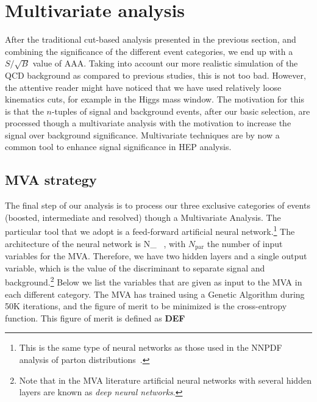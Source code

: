 
\section{Multivariate analysis}
\label{sec:mva}

After the traditional cut-based analysis presented in the previous section,
and combining the significance of the different event categories,
we end up with a $S/\sqrt{B}$ value of AAA.
%
Taking into account our more realistic simulation of the QCD background as
compared to previous studies, this is not too bad.
%
However, the attentive reader might have noticed that we have used
relatively 
loose kinematics cuts, for example in the Higgs mass window.
%
The motivation for this is that the $n$-tuples of signal and background
events, after our basic selection, are processed though a multivariate
analysis with the motivation to increase the signal over background
significance.
%
Multivariate techniques are by now a common tool to enhance signal
significance in HEP analysis.

\subsection{MVA strategy}

The final step of our analysis is to process our three exclusive
categories of events (boosted, intermediate and resolved) though
a Multivariate Analysis.
%
The particular tool that we adopt is
a feed-forward artificial neural network.\footnote{This is the
  same type of neural networks as those used in the
  NNPDF analysis of parton distributions~\cite{Ball:2010de}.}
%
The architecture of the neural network is
\be
\label{eq:nn1}
N_{} \, ,
\ee
with $N_{\mathrm{par}}$ the number of input variables for the MVA.
%
Therefore, we have two hidden layers and a single output variable, which
is the value of the discriminant to separate signal and background.\footnote{Note that in the MVA literature artificial neural networks with several hidden
  layers are known as {\it deep neural networks}.}
%
Below we list the variables that are given as input to the MVA in each
different category.
%
The MVA has trained using a Genetic Algorithm during 50K iterations,
and the figure of merit to be minimized is the cross-entropy function.
%
This figure of merit is defined as
\be
\bf DEF
\ee

